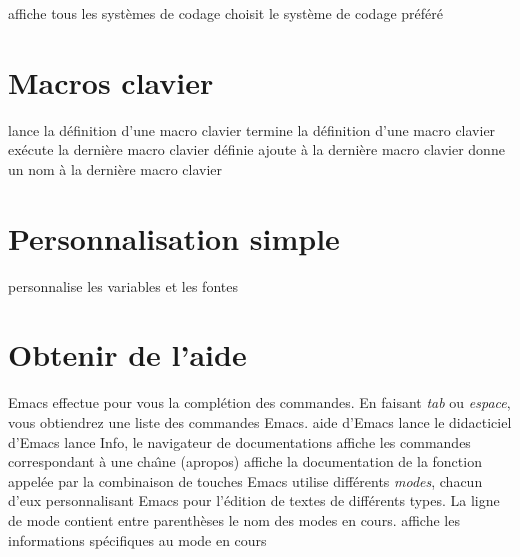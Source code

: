  affiche tous les syst\`emes de codage
 choisit le syst\`eme de codage pr\'ef\'er\'e

\section{Macros clavier}

 lance la d\'efinition d'une macro clavier
 termine la d\'efinition d'une macro clavier
 ex\'ecute la derni\`ere macro clavier d\'efinie
 ajoute \`a la derni\`ere macro clavier
 donne un nom \`a la derni\`ere macro clavier

\section{Personnalisation simple}

 personnalise les variables et les fontes

\section{Obtenir de l'aide}

Emacs effectue pour vous la compl\'etion des commandes. En faisant 
{\it tab\/} ou {\it espace\/}, vous obtiendrez une liste des commandes
Emacs.
\askip
{} aide d'Emacs
 lance le didacticiel d'Emacs
 lance Info, le navigateur de documentations
 affiche les commandes correspondant \`a une cha\^\i{}ne (apropos)
 affiche la documentation de la fonction appel\'ee par la
combinaison de touches
\askip
Emacs utilise diff\'erents {\it modes}, chacun d'eux personnalisant
Emacs pour l'\'edition de textes de diff\'erents types. La ligne de mode
contient entre parenth\`eses le nom des modes en cours.
\askip
{} affiche les informations sp\'ecifiques au mode en cours

\copyrightnotice

\bye

